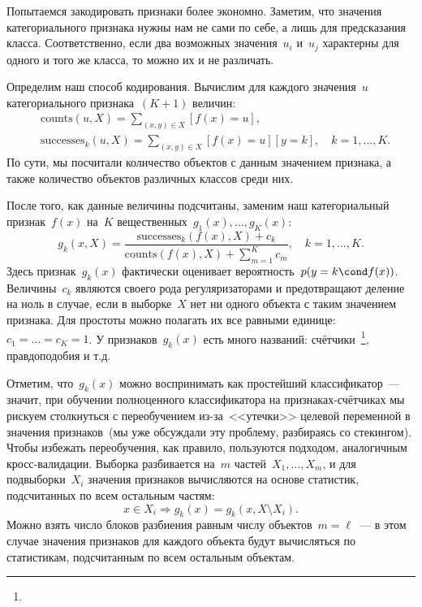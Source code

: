\documentclass[12pt,fleqn]{article}
\begin{document}
Попытаемся закодировать признаки более экономно.
Заметим, что значения категориального признака нужны нам не сами по себе,
а лишь для предсказания класса.
Соответственно, если два возможных значения~$u_i$ и~$u_j$ характерны для одного и того же класса,
то можно их и не различать.

Определим наш способ кодирования.
Вычислим для каждого значения~$u$ категориального признака~$(K + 1)$ величин:
\begin{align*}
    &\text{counts}(u, X)
    =
    \sum_{(x, y) \in X} [f(x) = u],\\
    &\text{successes}_k(u, X)
    =
    \sum_{(x, y) \in X} [f(x) = u] [y = k],
    \quad
    k = 1, \dots, K.
\end{align*}
По сути, мы посчитали количество объектов с данным значением признака,
а также количество объектов различных классов среди них.

После того, как данные величины подсчитаны, заменим наш категориальный признак~$f(x)$ на~$K$
вещественных~$g_1(x), \dots, g_K(x)$:
\[
    g_k(x, X)
    =
    \frac{
        \text{successes}_k(f(x), X)
        +
        c_k
    }{
        \text{counts}(f(x), X)
        +
        \sum_{m = 1}^{K} c_m
    },
    \quad
    k = 1, \dots, K.
\]
Здесь признак~$g_k(x)$ фактически оценивает вероятность~$p(y = k \cond f(x))$.
Величины~$c_k$ являются своего рода регуляризаторами и предотвращают деление на ноль в случае,
если в выборке~$X$ нет ни одного объекта с таким значением признака.
Для простоты можно полагать их все равными единице:~$c_1 = \dots = c_K = 1$.
У признаков~$g_k(x)$ есть много названий: счётчики~\footnote{\sloppy{}},
правдоподобия и т.д.

Отметим, что~$g_k(x)$ можно воспринимать как простейший классификатор~---
значит, при обучении полноценного классификатора на признаках-счётчиках
мы рискуем столкнуться с переобучением из-за~<<утечки>> целевой переменной в значения признаков~(мы уже
обсуждали эту проблему, разбираясь со стекингом).
Чтобы избежать переобучения, как правило, пользуются подходом, аналогичным кросс-валидации.
Выборка разбивается на~$m$ частей~$X_1, \dots, X_m$,
и для подвыборки~$X_i$ значения признаков вычисляются на основе статистик,
подсчитанных по всем остальным частям:
\[
    x \in X_i
    \Rightarrow
    g_k(x) = g_k(x, X \setminus X_i).
\]
Можно взять число блоков разбиения равным числу объектов~$m = \ell$~---
в этом случае значения признаков для каждого объекта будут вычисляться
по статистикам, подсчитанным по всем остальным объектам.
\end{document}
